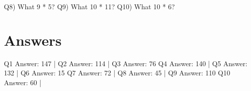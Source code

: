 \documentclass{article}%
\begin{document}
\newline%
\newline%
\newline%
\newline%
%
Q8)  What 9 * 5?%
\newline%
\newline%
\newline%
\newline%
\newline%
\newline%
\newline%
%
Q9)  What 10 * 11?%
\newline%
\newline%
\newline%
\newline%
\newline%
\newline%
\newline%
%
Q10)  What 10 * 6?%
\newline%
\newline%
\newline%
\newline%
\newline%
\newline%
\newline%

%

    \newpage
\section{Answers}%
\label{sec:Answers}%
Q1 Answer: 147   |   Q2 Answer: 114   |   Q3 Answer: 76\newline%
Q4 Answer: 140   |   Q5 Answer: 132   |   Q6 Answer: 15\newline%
Q7 Answer: 72   |   Q8 Answer: 45   |   Q9 Answer: 110\newline%
Q10 Answer: 60   |   

%
\end{document}
